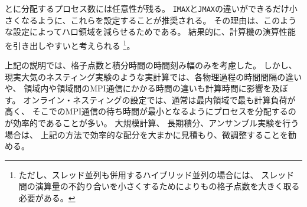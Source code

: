 {\XDIR} と{\YDIR}に分配するプロセス数には任意性が残る。
\verb|IMAX|と\verb|JMAX|の違いができるだけ小さくなるように、これらを設定することが推奨される。
その理由は、このような設定によってハロ領域を減らせるためである。
結果的に、計算機の演算性能を引き出しやすいと考えられる
\footnote{ただし、スレッド並列も併用するハイブリッド並列の場合には、
スレッド間の演算量の不釣り合いを小さくするために{\XDIR}よりも{\YDIR}の格子点数を大きく取る必要がある。}。


上記の説明では、格子点数と積分時間の時間刻み幅のみを考慮した。
しかし、現実大気のネスティング実験のような実計算では、各物理過程の時間間隔の違いや、
領域内や領域間のMPI通信にかかる時間の違いも計算時間に影響を及ぼす。
オンライン・ネスティングの設定では、通常は最内領域で最も計算負荷が高く、
そこでのMPI通信の待ち時間が最小となるようにプロセスを分配するのが効率的であることが多い。
大規模計算、 長期積分、アンサンブル実験を行う場合は、
上記の方法で効率的な配分を大まかに見積もり、微調整することを勧める。
